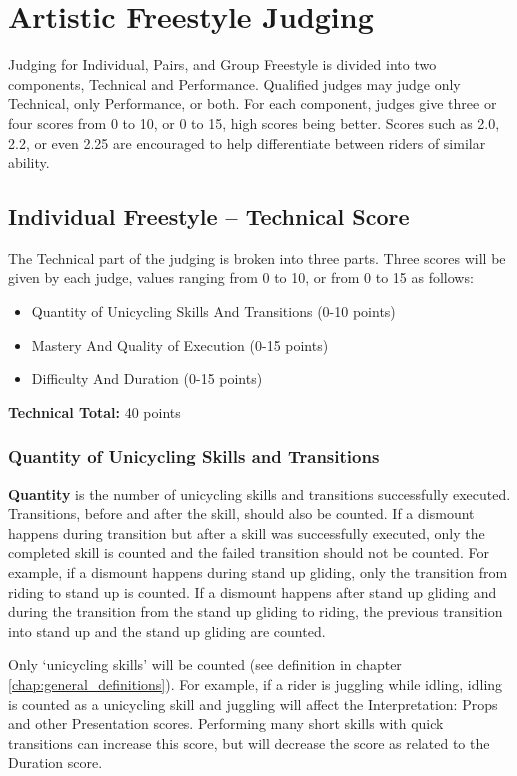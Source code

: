 \section{Artistic Freestyle Judging}

Judging for Individual, Pairs, and Group Freestyle is divided into two components, Technical and Performance.
Qualified judges may judge only Technical, only Performance, or both.
For each component, judges give three or four scores from 0 to 10, or 0 to 15, high scores being better.
Scores such as 2.0, 2.2, or even 2.25 are encouraged to help differentiate between riders of similar ability.

\subsection{Individual Freestyle -- Technical Score \label{sec:freestyle_individual-technical-score}}
The Technical part of the judging is broken into three parts.
Three scores will be given by each judge, values ranging from 0 to 10, or from 0 to 15 as follows: 
\begin{itemize}
\item Quantity of Unicycling Skills And Transitions (0-10 points) 
\item Mastery And Quality of Execution (0-15 points) 
\item Difficulty And Duration (0-15 points) 
\end{itemize}
\textbf{Technical Total:} 40 points

\subsubsection{Quantity of Unicycling Skills and Transitions}
\textbf{Quantity} is the number of unicycling skills and transitions successfully executed.
Transitions, before and after the skill, should also be counted.
If a dismount happens during transition but after a skill was successfully executed, only the completed skill is counted and the failed transition should not be counted.
For example, if a dismount happens during stand up gliding, only the transition from riding to stand up is counted.
If a dismount happens after stand up gliding and during the transition from the stand up gliding to riding, the previous transition into stand up and the stand up gliding are counted.

Only `unicycling skills' will be counted (see definition in chapter \ref{chap:general_definitions}).
For example, if a rider is juggling while idling, idling is counted as a unicycling skill and juggling will affect the Interpretation: Props and other Presentation scores.
Performing many short skills with quick transitions can increase this score, but will decrease the score as related to the Duration score.

